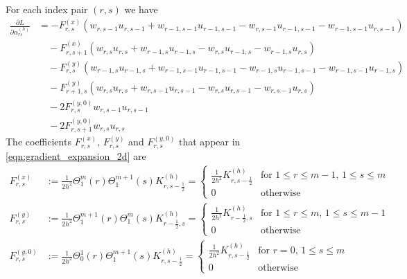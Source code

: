 \documentclass[11pt]{article}
\begin{document}
For each index pair $(r,s)$ we have
\begin{equation}
    \begin{aligned}
    \frac{\partial L}{\partial\alpha^{(h)}_{rs}}
    &= -F^{(x)}_{r,s}\left(w_{r,s-1}u_{r,s-1}+w_{r-1,s-1}u_{r-1,s-1}-w_{r,s-1}u_{r-1,s-1}-w_{r-1,s-1}u_{r,s-1}\right)\\
     &\quad - F^{(x)}_{r,s+1}\left(w_{r,s}u_{r,s}+w_{r-1,s}u_{r-1,s}-w_{r,s}u_{r-1,s}-w_{r-1,s}u_{r,s}\right)\\
     &\quad- F^{(y)}_{r,s}\left(w_{r-1,s}u_{r-1,s}+w_{r-1,s-1}u_{r-1,s-1}-w_{r-1,s}u_{r-1,s-1}-w_{r-1,s-1}u_{r-1,s}\right)\\
     &\quad - F^{(y)}_{r+1,s}\left(w_{r,s}u_{r,s}+w_{r,s-1}u_{r,s-1}-w_{r,s}u_{r,s-1}-w_{r,s-1}u_{r,s}\right)\\
    &\quad - 2F^{(y,0)}_{r,s}w_{r,s-1}u_{r,s-1}\\
    &\quad - 2F^{(y,0)}_{r,s+1}w_{r,s}u_{r,s}
    \end{aligned}\label{eqn:gradient_expansion_2d}
\end{equation}
The coefficients $F^{(x)}_{r,s}$, $F^{(y)}_{r,s}$ and $F^{(y,0)}_{r,s}$ that appear in \eqref{eqn:gradient_expansion_2d} are
\begin{equation}
    \begin{aligned}
        F^{(x)}_{r,s} &:= \frac{1}{2h^2}\Theta_1^{m}(r)\Theta_1^{m+1}(s)K^{(h)}_{r,s-\frac{1}{2}}=\begin{cases}
            \frac{1}{2h^2}K^{(h)}_{r,s-\frac{1}{2}} & \text{for $1\le r\le m-1$, $1\le s\le m$}\\
            0 & \text{otherwise}
        \end{cases}\\
        F^{(y)}_{r,s} &:= \frac{1}{2h^2}\Theta_1^{m+1}(r)\Theta_1^{m}(s)K^{(h)}_{r-\frac{1}{2},s}
        =\begin{cases}
            \frac{1}{2h^2}K^{(h)}_{r-\frac{1}{2},s} & \text{for $1\le r\le m$, $1\le s\le m-1$}\\
            0 & \text{otherwise}
        \end{cases}\\
        F^{(y,0)}_{r,s} &:= \frac{1}{2h^2}\Theta_0^1(r)\Theta_1^{m+1}(s)K^{(h)}_{r,s-\frac{1}{2}}=\begin{cases}
            \frac{1}{2h^2}K^{(h)}_{r,s-\frac{1}{2}} & \text{for $r=0$, $1\le s\le m$}\\
            0 & \text{otherwise}
        \end{cases}
    \end{aligned}
\end{equation}
\end{document}
